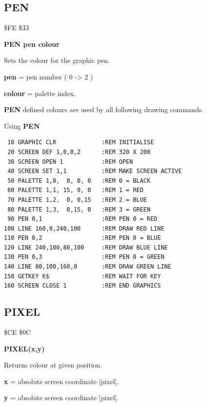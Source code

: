 \subsection{PEN}
\begin{description}[leftmargin=2cm,style=nextline]
\item [Token:] \$FE \$33
\item [Format:] {\bf PEN pen colour}
\item [Usage:]  Sets the colour for the graphic pen.

                {\bf pen} = pen number ( 0 -> 2 )

                {\bf colour} = palette index.

\item [Remarks:] {\bf PEN} defined colours are used by all
                 following drawing commands.

\item [Example:] Using {\bf PEN}

\begin{tcolorbox}[colback=black,coltext=white]
\verbatimfont{\codefont}
\begin{verbatim}
 10 GRAPHIC CLR             :REM INITIALISE
 20 SCREEN DEF 1,0,0,2      :REM 320 X 200
 30 SCREEN OPEN 1           :REM OPEN
 40 SCREEN SET 1,1          :REM MAKE SCREEN ACTIVE
 50 PALETTE 1,0,  0, 0, 0   :REM 0 = BLACK
 60 PALETTE 1,1, 15, 0, 0   :REM 1 = RED
 70 PALETTE 1,2,  0, 0,15   :REM 2 = BLUE
 80 PALETTE 1,3,  0,15, 0   :REM 3 = GREEN
 90 PEN 0,1                 :REM PEN 0 = RED
100 LINE 160,0,240,100      :REM DRAW RED LINE
110 PEN 0,2                 :REM PEN 0 = BLUE
120 LINE 240,100,80,100     :REM DRAW BLUE LINE
130 PEN 0,3                 :REM PEN 0 = GREEN
140 LINE 80,100,160,0       :REM DRAW GREEN LINE
150 GETKEY K$               :REM WAIT FOR KEY
160 SCREEN CLOSE 1          :REM END GRAPHICS
\end{verbatim}
\end{tcolorbox}
\end{description}




\newpage
\subsection{PIXEL}
\begin{description}[leftmargin=2cm,style=nextline]
\item [Token:] \$CE \$0C
\item [Format:] {\bf PIXEL(x,y)}
\item [Usage:]  Returns colour at given position.

               {\bf x} = absolute screen coordinate [pixel].

               {\bf y} = absolute screen coordinate [pixel].
\end{description}



